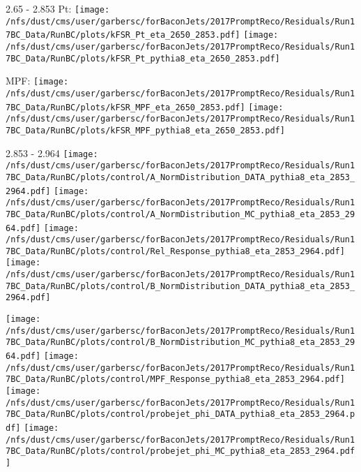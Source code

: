 \documentclass[t,compress]{beamer}
\begin{document}
\begin{frame}{2.65 - 2.853}
	 Pt: \texttt{[image: /nfs/dust/cms/user/garbersc/forBaconJets/2017PromptReco/Residuals/Run17BC\_Data/RunBC/plots/kFSR\_Pt\_eta\_2650\_2853.pdf]}
	\texttt{[image: /nfs/dust/cms/user/garbersc/forBaconJets/2017PromptReco/Residuals/Run17BC\_Data/RunBC/plots/kFSR\_Pt\_pythia8\_eta\_2650\_2853.pdf]}
\newline

	 MPF: \texttt{[image: /nfs/dust/cms/user/garbersc/forBaconJets/2017PromptReco/Residuals/Run17BC\_Data/RunBC/plots/kFSR\_MPF\_eta\_2650\_2853.pdf]}
	\texttt{[image: /nfs/dust/cms/user/garbersc/forBaconJets/2017PromptReco/Residuals/Run17BC\_Data/RunBC/plots/kFSR\_MPF\_pythia8\_eta\_2650\_2853.pdf]}
\end{frame}

\begin{frame}{2.853 - 2.964}
	\texttt{[image: /nfs/dust/cms/user/garbersc/forBaconJets/2017PromptReco/Residuals/Run17BC\_Data/RunBC/plots/control/A\_NormDistribution\_DATA\_pythia8\_eta\_2853\_2964.pdf]}
	\texttt{[image: /nfs/dust/cms/user/garbersc/forBaconJets/2017PromptReco/Residuals/Run17BC\_Data/RunBC/plots/control/A\_NormDistribution\_MC\_pythia8\_eta\_2853\_2964.pdf]}
	\texttt{[image: /nfs/dust/cms/user/garbersc/forBaconJets/2017PromptReco/Residuals/Run17BC\_Data/RunBC/plots/control/Rel\_Response\_pythia8\_eta\_2853\_2964.pdf]}
	\texttt{[image: /nfs/dust/cms/user/garbersc/forBaconJets/2017PromptReco/Residuals/Run17BC\_Data/RunBC/plots/control/B\_NormDistribution\_DATA\_pythia8\_eta\_2853\_2964.pdf]}
\newline

	\texttt{[image: /nfs/dust/cms/user/garbersc/forBaconJets/2017PromptReco/Residuals/Run17BC\_Data/RunBC/plots/control/B\_NormDistribution\_MC\_pythia8\_eta\_2853\_2964.pdf]}
	\texttt{[image: /nfs/dust/cms/user/garbersc/forBaconJets/2017PromptReco/Residuals/Run17BC\_Data/RunBC/plots/control/MPF\_Response\_pythia8\_eta\_2853\_2964.pdf]}
	\texttt{[image: /nfs/dust/cms/user/garbersc/forBaconJets/2017PromptReco/Residuals/Run17BC\_Data/RunBC/plots/control/probejet\_phi\_DATA\_pythia8\_eta\_2853\_2964.pdf]}
	\texttt{[image: /nfs/dust/cms/user/garbersc/forBaconJets/2017PromptReco/Residuals/Run17BC\_Data/RunBC/plots/control/probejet\_phi\_MC\_pythia8\_eta\_2853\_2964.pdf]}
\end{frame}
\end{document}
